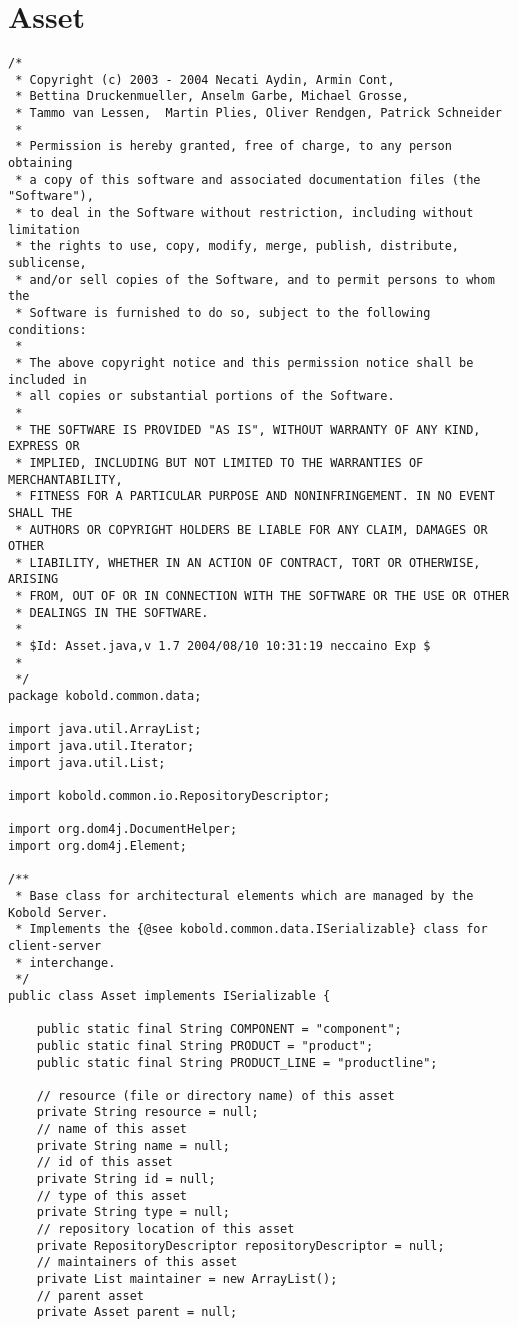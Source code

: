 \section{Asset}
\small \begin{verbatim}
/*
 * Copyright (c) 2003 - 2004 Necati Aydin, Armin Cont, 
 * Bettina Druckenmueller, Anselm Garbe, Michael Grosse, 
 * Tammo van Lessen,  Martin Plies, Oliver Rendgen, Patrick Schneider
 * 
 * Permission is hereby granted, free of charge, to any person obtaining
 * a copy of this software and associated documentation files (the "Software"),
 * to deal in the Software without restriction, including without limitation
 * the rights to use, copy, modify, merge, publish, distribute, sublicense, 
 * and/or sell copies of the Software, and to permit persons to whom the 
 * Software is furnished to do so, subject to the following conditions:
 *
 * The above copyright notice and this permission notice shall be included in 
 * all copies or substantial portions of the Software.
 *
 * THE SOFTWARE IS PROVIDED "AS IS", WITHOUT WARRANTY OF ANY KIND, EXPRESS OR 
 * IMPLIED, INCLUDING BUT NOT LIMITED TO THE WARRANTIES OF MERCHANTABILITY, 
 * FITNESS FOR A PARTICULAR PURPOSE AND NONINFRINGEMENT. IN NO EVENT SHALL THE 
 * AUTHORS OR COPYRIGHT HOLDERS BE LIABLE FOR ANY CLAIM, DAMAGES OR OTHER 
 * LIABILITY, WHETHER IN AN ACTION OF CONTRACT, TORT OR OTHERWISE, ARISING 
 * FROM, OUT OF OR IN CONNECTION WITH THE SOFTWARE OR THE USE OR OTHER 
 * DEALINGS IN THE SOFTWARE.
 *
 * $Id: Asset.java,v 1.7 2004/08/10 10:31:19 neccaino Exp $
 *
 */
package kobold.common.data;

import java.util.ArrayList;
import java.util.Iterator;
import java.util.List;

import kobold.common.io.RepositoryDescriptor;

import org.dom4j.DocumentHelper;
import org.dom4j.Element;

/**
 * Base class for architectural elements which are managed by the Kobold Server.
 * Implements the {@see kobold.common.data.ISerializable} class for client-server
 * interchange.
 */
public class Asset implements ISerializable {

	public static final String COMPONENT = "component";
	public static final String PRODUCT = "product";
	public static final String PRODUCT_LINE = "productline";

	// resource (file or directory name) of this asset
	private String resource = null;
	// name of this asset
	private String name = null;
	// id of this asset
	private String id = null;
	// type of this asset
	private String type = null;
	// repository location of this asset
	private RepositoryDescriptor repositoryDescriptor = null;
	// maintainers of this asset
	private List maintainer = new ArrayList();
	// parent asset
	private Asset parent = null;
	

\end{verbatim}
